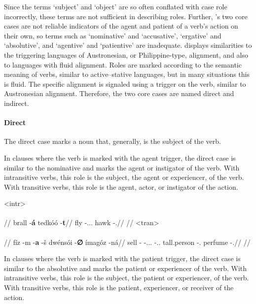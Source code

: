 Since the terms \enquote*{subject} and \enquote*{object} are so often conflated with case role incorrectly, these terms are not sufficient in describing roles. Further, \lang{}'s two core cases are not reliable indicators of the agent and patient of a verb's action on their own, so terms such as \enquote*{nominative} and \enquote*{accusative}, \enquote*{ergative} and \enquote*{absolutive}, and \enquote*{agentive} and \enquote*{patientive} are inadequate. \lang{} displays similarities to the triggering languages of Austronesian, or Philippine-type, alignment, and also to languages with fluid alignment. Roles are marked according to the semantic meaning of verbs, similar to active--stative languages, but in many situations this is fluid. The specific alignment is signaled using a trigger on the verb, similar to Austronesian alignment. Therefore, the two core cases are named direct and indirect.

\paragraph{Direct}

The direct case marks a noun that, generally, is the subject of the verb.

In clauses where the verb is marked with the agent trigger, the direct case is similar to the nominative and marks the agent or instigator of the verb. With intransitive verbs, this role is the subject, the agent or experiencer, of the verb. With transitive verbs, this role is the agent, actor, or instigator of the action.

	\a<intr>\begingl
		\glpreamble{}\\
		\\
		//
		\gla brall -\textbf{á} tedkóó -\textbf{t}//
		\glb fly -\At.\Dir.\Tpp.\Prox{} hawk -\Dir.\Pl//
		\glft {}//
	\endgl
	\a<tran>\begingl
		\glpreamble{}\\
		\\
		//
		\gla fíz -m -\textbf{a} -š dwénsói -\textbf{∅} ímagóz -ná//
		\glb sell -\Prg{} -\At.\Dir.\Tps.\Prox{} -\Idr.\Tpp.\Obv{} tall.person -\Dir.\Sg{} perfume -\Idr.\Pl//
		\glft {}//
	\endgl
\xe

In clauses where the verb is marked with the patient trigger, the direct case is similar to the absolutive and marks the patient or experiencer of the verb. With intransitive verbs, this role is the subject, the patient or experiencer, of the verb. With transitive verbs, this role is the patient, experiencer, or receiver of the action.

